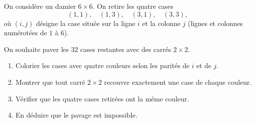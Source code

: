 On considère un damier $6 \times 6$. On retire les quatre cases
\[
(1, 1), \quad (1, 3), \quad (3, 1), \quad (3, 3),
\]
où $(i, j)$ désigne la case située sur la ligne $i$ et la colonne $j$ (lignes et colonnes numérotées de $1$ à $6$).

On souhaite paver les $32$ cases restantes avec des carrés $2 \times 2$.
\begin{enumerate}
  \item Colorier les cases avec quatre couleurs selon les parités de $i$ et de
  $j$.
  \item Montrer que tout carré $2 \times 2$ recouvre exactement une case de
  chaque couleur.
  \item Vérifier que les quatre cases retirées ont la même couleur.
  \item En déduire que le pavage est impossible.
\end{enumerate}
